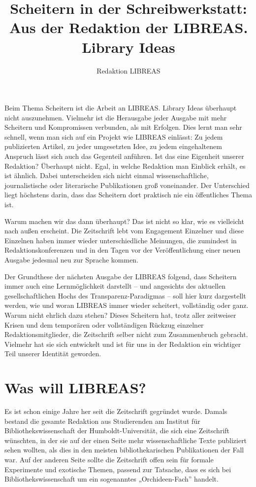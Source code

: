 \documentclass[output=paper]{langscibook}
\title{Scheitern in der Schreibwerkstatt: Aus der Redaktion der LIBREAS. Library Ideas}
\author{Redaktion LIBREAS}
\begin{document}
\maketitle


\noindent Beim Thema Scheitern ist die Arbeit an LIBREAS. Library Ideas überhaupt nicht auszunehmen. Vielmehr ist die Herausgabe jeder Ausgabe mit mehr Scheitern und Kompromissen verbunden, als mit Erfolgen. Dies lernt man sehr schnell, wenn man sich auf ein Projekt wie LIBREAS einlässt: Zu jedem publizierten Artikel, zu jeder umgesetzten Idee, zu jedem eingehaltenem Anspruch lässt sich auch das Gegenteil anführen. Ist das eine Eigenheit unserer Redaktion? Überhaupt nicht. Egal, in welche Redaktion man Einblick erhält, es ist ähnlich. Dabei unterscheiden sich nicht einmal wissenschaftliche, journalistische oder literarische Publikationen groß voneinander. Der Unterschied liegt höchstens darin, dass das Scheitern dort praktisch nie ein öffentliches Thema ist.

Warum machen wir das dann überhaupt? Das ist nicht so klar, wie es vielleicht nach außen erscheint. Die Zeitschrift lebt vom Engagement Einzelner und diese Einzelnen haben immer wieder unterschiedliche Meinungen, die zumindest in Redaktionskonferenzen und in den Tagen vor der Veröffentlichung einer neuen Ausgabe jedesmal neu zur Sprache kommen.

Der Grundthese der nächsten Ausgabe der LIBREAS folgend, dass Scheitern immer auch eine Lernmöglichkeit darstellt – und angesichts des aktuellen gesellschaftlichen Hochs des Transparenz-Paradigmas – soll hier kurz dargestellt werden, wie und woran LIBREAS immer wieder scheitert, vollständig oder ganz. Warum nicht ehrlich dazu stehen? Dieses Scheitern hat, trotz aller zeitweiser Krisen und dem temporären oder vollständigen Rückzug einzelner Redaktionsmitglieder, die Zeitschrift selber nicht zum Zusammenbruch gebracht. Vielmehr hat sie sich entwickelt und ist für uns in der Redaktion ein wichtiger Teil unserer Identität geworden.

\section*{Was will LIBREAS?}\label{Was will LIBREAS?}

Es ist schon einige Jahre her seit die Zeitschrift gegründet wurde. Damals bestand die gesamte Redaktion aus Studierenden am Institut für Bibliothekswissenschaft der Humboldt-Universität, die sich eine Zeitschrift wünschten, in der sie auf der einen Seite mehr wissenschaftliche Texte publiziert sehen wollten, als dies in den meisten bibliothekarischen Publikationen der Fall war. Auf der anderen Seite sollte die Zeitschrift offen sein für formale Experimente und exotische Themen, passend zur Tatsache, dass es sich bei Bibliothekswissenschaft um ein sogenanntes „Orchideen-Fach” handelt.
\end{document}
